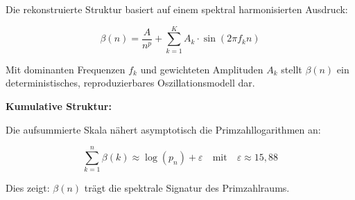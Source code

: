 \usepackage{amsmath, amssymb, tcolorbox}

\begin{tcolorbox}[
  title=Beta-Skala: Frequenzbasierte Struktur,
  colback=white!95!blue!2,
  colframe=blue!40,
  coltitle=black,
  fonttitle=\bfseries,
  enhanced,
  breakable
]

Die rekonstruierte Struktur basiert auf einem spektral harmonisierten Ausdruck:

\[
\boxed{
\beta(n) = \frac{A}{n^p} + \sum_{k=1}^{K} A_k \cdot \sin(2\pi f_k n)
}
\]

\vspace{0.5em}

Mit dominanten Frequenzen \(f_k\) und gewichteten Amplituden \(A_k\) stellt \(\beta(n)\) ein deterministisches, reproduzierbares Oszillationsmodell dar.

\vspace{1em}

\textbf{Kumulative Struktur:}

Die aufsummierte Skala nähert asymptotisch die Primzahllogarithmen an:

\[
\boxed{
\sum_{k=1}^{n} \beta(k) \approx \log(p_n) + \varepsilon
\quad \text{mit} \quad \varepsilon \approx 15{,}88
}
\]

\vspace{1em}

Dies zeigt: \(\beta(n)\) trägt die spektrale Signatur des Primzahlraums.

\end{tcolorbox}